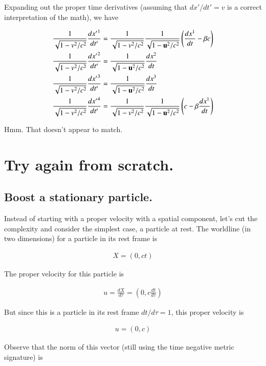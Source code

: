 \documentclass{article}
\begin{document}
Expanding out the proper time derivatives (assuming that $dx'/dt' = v$ is a correct interpretation of the math), we have

\begin{align*}
\frac{1}{\sqrt{1 - v^2/c^2}} \frac{{dx'}^1}{dt'} &= \frac{1}{\sqrt{1 - v^2/c^2}} \frac{1}{\sqrt{1 - \mathbf{u}^2/c^2}} \left( \frac{dx^1}{dt} - \beta c \right) \\
\frac{1}{\sqrt{1 - v^2/c^2}} \frac{{dx'}^2}{dt'} &= \frac{1}{\sqrt{1 - \mathbf{u}^2/c^2}} \frac{dx^2}{dt} \\
\frac{1}{\sqrt{1 - v^2/c^2}} \frac{{dx'}^3}{dt'} &= \frac{1}{\sqrt{1 - \mathbf{u}^2/c^2}} \frac{dx^3}{dt} \\
\frac{1}{\sqrt{1 - v^2/c^2}} \frac{{dx'}^4}{dt'} &= \frac{1}{\sqrt{1 - v^2/c^2}} \frac{1}{\sqrt{1 - \mathbf{u}^2/c^2}} \left( c - \beta \frac{dx^1}{dt} \right)
\end{align*}

Hmm.  That doesn't appear to match.

\section{ Try again from scratch. }

\subsection{ Boost a stationary particle. }

Instead of starting with a proper velocity with a spatial component, let's cut the complexity and consider the simplest case, a particle at rest.  The worldline (in two dimensions) for a particle in its rest frame is

\begin{align*}
X = (0, ct) 
\end{align*}

The proper velocity for this particle is 

\begin{align*}
u = \frac{dX}{d\tau} = \left(0, c\frac{dt}{d\tau} \right) 
\end{align*}

But since this is a particle in its rest frame $dt/d\tau = 1$, this proper velocity is

\begin{align*}
u = \left(0, c \right) 
\end{align*}

Observe that the norm of this vector (still using the time negative metric signature) is
\end{document}
